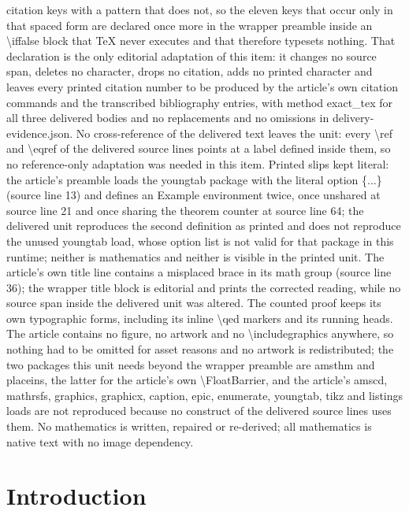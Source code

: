 \documentclass[10pt,a4paper]{amsart}
\theoremstyle{plain}
\theoremstyle{definition}
\numberwithin{equation}{section}
\begin{document}
citation keys with a pattern that does not, so the eleven keys that occur only in that spaced form are declared once more in the wrapper preamble inside an \textbackslash{}iffalse block that TeX never executes and that therefore typesets nothing. That declaration is the only editorial adaptation of this item: it changes no source span, deletes no character, drops no citation, adds no printed character and leaves every printed citation number to be produced by the article's own citation commands and the transcribed bibliography entries, with method exact\_tex for all three delivered bodies and no replacements and no omissions in delivery-evidence.json. No cross-reference of the delivered text leaves the unit: every \textbackslash{}ref and \textbackslash{}eqref of the delivered source lines points at a label defined inside them, so no reference-only adaptation was needed in this item. Printed slips kept literal: the article's preamble loads the youngtab package with the literal option \{...\} (source line 13) and defines an Example environment twice, once unshared at source line 21 and once sharing the theorem counter at source line 64; the delivered unit reproduces the second definition as printed and does not reproduce the unused youngtab load, whose option list is not valid for that package in this runtime; neither is mathematics and neither is visible in the printed unit. The article's own title line contains a misplaced brace in its math group (source line 36); the wrapper title block is editorial and prints the corrected reading, while no source span inside the delivered unit was altered. The counted proof keeps its own typographic forms, including its inline \textbackslash{}qed markers and its running heads. The article contains no figure, no artwork and no \textbackslash{}includegraphics anywhere, so nothing had to be omitted for asset reasons and no artwork is redistributed; the two packages this unit needs beyond the wrapper preamble are amsthm and placeins, the latter for the article's own \textbackslash{}FloatBarrier, and the article's amscd, mathrsfs, graphics, graphicx, caption, epic, enumerate, youngtab, tikz and listings loads are not reproduced because no construct of the delivered source lines uses them. No mathematics is written, repaired or re-derived; all mathematics is native text with no image dependency.
\section{Introduction}
\end{document}
